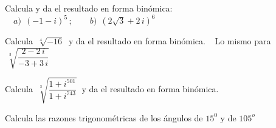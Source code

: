 \begin{mipropuesto}

Calcula y da el resultado en forma binómica: $\quad a)\ \ (-1- i)^5	\, ; \qquad b)\ \ (2\sqrt{3}+2\, i)^6$
\end{mipropuesto}

\vspace{-8mm}
\begin{flushright}
\begin{footnotesize} \textcolor{gris}{}	\end{footnotesize}
\end{flushright}

\begin{mipropuesto}

Calcula $\ \sqrt[4]{-16} \ $ y da el resultado en forma binómica.	
$\ \ $ Lo mismo para $\ \sqrt[3]{\dfrac{2-2\, i}{-3+3\, i}}$
\end{mipropuesto}

\vspace{-8mm}
\begin{flushright}
\begin{footnotesize} \textcolor{gris}{}	\end{footnotesize}
\end{flushright}

\begin{mipropuesto}

Calcula $\ \sqrt[3]{\dfrac{1+i^{501}}{1+i^{743}}} \ $ y da el resultado en forma binómica.
\end{mipropuesto}

\vspace{-8mm}
\begin{flushright}
\begin{footnotesize} \textcolor{gris}{}	\end{footnotesize}
\end{flushright}


\begin{mipropuesto}

Calcula las razones trigonométricas de los ángulos de $15^0$ y de $105^o$
\end{mipropuesto}

\vspace{-8mm}
\begin{flushright}
\begin{footnotesize} \textcolor{gris}{}	\end{footnotesize}
\end{flushright}

